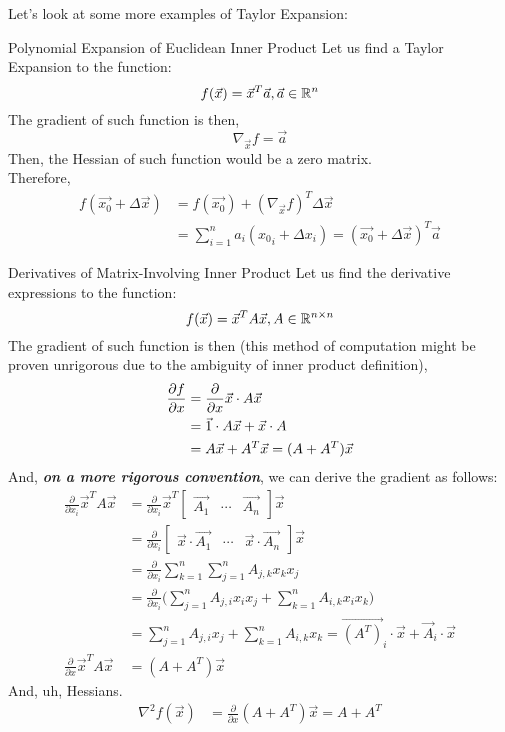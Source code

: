 Let's look at some more examples of Taylor Expansion:
\begin{ln-explain}{Polynomial Expansion of Euclidean Inner Product}{}
    Let us find a Taylor Expansion to the function:
    \[
        f(\vec{x}) = \vec{x}^T \vec{a}, \vec{a} \in \mathbb{R}^n
    \]
    The gradient of such function is then,
    \[
        \nabla_{\vec{x}} f = \vec{a}
    \]
    Then, the Hessian of such function would be a zero matrix. \\
    Therefore,
    \begin{align*}
        f(\vec{x_0} + \Delta \vec{x})
        &= f(\vec{x_0}) + {(\nabla_{\vec{x}} f)}^T \Delta \vec{x} \\
        &= \sum_{i = 1}^n a_i ({x_0}_i + \Delta x_i) = {(\vec{x_0} + \Delta \vec{x})}^T \vec{a}
    \end{align*}
\end{ln-explain}

\begin{ln-explain}{Derivatives of Matrix-Involving Inner Product}{}
    Let us find the derivative expressions to the function:
    \[
        f(\vec{x}) = \vec{x}^T A \vec{x}, A \in \mathbb{R}^{n \times n}
    \]
    The gradient of such function is then (this method of computation might be proven unrigorous due to the ambiguity of inner product definition),
    \begin{align*}
        \pdv{f}{x}
        &= \frac{\partial}{\partial x} \vec{x} \cdot A \vec{x} \\
        &= \vec{1} \cdot A \vec{x} + \vec{x} \cdot A \\
        &= A \vec{x} + A^T \vec{x} = (A + A^T) \vec{x}
    \end{align*}
    And, \textit{\textbf{on a more rigorous convention}}, we can derive the gradient as follows:
    \begin{align*}
        \frac{\partial}{\partial x_i} \vec{x}^T A \vec{x}
        &= \frac{\partial}{\partial x_i} \vec{x}^T \begin{bmatrix} \vec{A_1} & \cdots & \vec{A_n} \end{bmatrix} \vec{x} \\
        &= \frac{\partial}{\partial x_i} \begin{bmatrix} \vec{x} \cdot \vec{A_1} & \cdots & \vec{x} \cdot \vec{A_n} \end{bmatrix} \vec{x} \\
        &= \frac{\partial}{\partial x_i} \sum_{k = 1}^n \sum_{j = 1}^n A_{j, k} x_k x_j \\
        &= \frac{\partial}{\partial x_i} \bigg( \sum_{j = 1}^n A_{j, i} x_i x_j + \sum_{k = 1}^n A_{i, k} x_i x_k \bigg) \\
        &= \sum_{j = 1}^n A_{j, i} x_j + \sum_{k = 1}^n A_{i, k} x_k
        = \vec{(A^T)}_i \cdot \vec{x} + \vec{A}_i \cdot\vec{x} \\
        \frac{\partial}{\partial x} \vec{x}^T A \vec{x} &= (A + A^T) \vec{x}
    \end{align*}
    And, uh, Hessians.
    \begin{align*}
        \nabla^2 f(\vec{x})
        &= \frac{\partial}{\partial x} (A + A^T) \vec{x} = A + A^T
    \end{align*}
\end{ln-explain}

